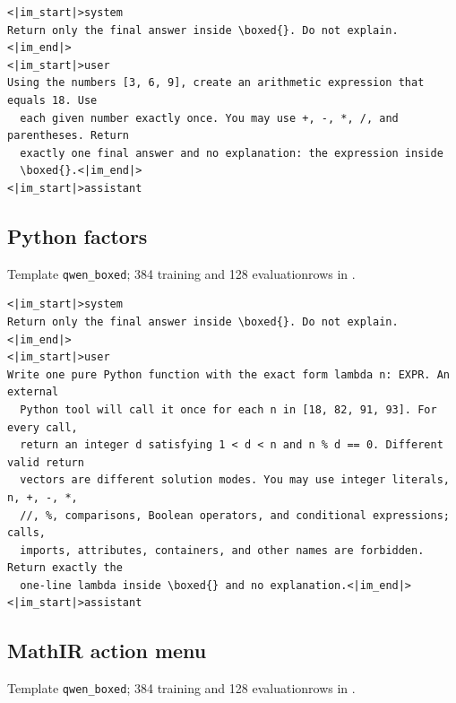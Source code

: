 \documentclass{article}
\newcommand{\1}{\mathbf 1}
\theoremstyle{remark}
\theoremstyle{definition}
\theoremstyle{plain}
\begin{document}
\begin{Verbatim}[fontsize=\scriptsize,frame=single,framesep=4pt,rulecolor=\color{black!25},samepage=true]
<|im_start|>system
Return only the final answer inside \boxed{}. Do not explain.<|im_end|>
<|im_start|>user
Using the numbers [3, 6, 9], create an arithmetic expression that equals 18. Use
  each given number exactly once. You may use +, -, *, /, and parentheses. Return
  exactly one final answer and no explanation: the expression inside
  \boxed{}.<|im_end|>
<|im_start|>assistant
\end{Verbatim}

\filbreak
\subsection{Python factors}
\label{app:prompt-python}

\noindent Template \texttt{qwen\_boxed}; 384 training and 128 evaluation\newline rows in .

\begin{Verbatim}[fontsize=\scriptsize,frame=single,framesep=4pt,rulecolor=\color{black!25},samepage=true]
<|im_start|>system
Return only the final answer inside \boxed{}. Do not explain.<|im_end|>
<|im_start|>user
Write one pure Python function with the exact form lambda n: EXPR. An external
  Python tool will call it once for each n in [18, 82, 91, 93]. For every call,
  return an integer d satisfying 1 < d < n and n % d == 0. Different valid return
  vectors are different solution modes. You may use integer literals, n, +, -, *,
  //, %, comparisons, Boolean operators, and conditional expressions; calls,
  imports, attributes, containers, and other names are forbidden. Return exactly the
  one-line lambda inside \boxed{} and no explanation.<|im_end|>
<|im_start|>assistant
\end{Verbatim}

\filbreak
\subsection{MathIR action menu}
\label{app:prompt-mathir}

\noindent Template \texttt{qwen\_boxed}; 384 training and 128 evaluation\newline rows in .
\end{document}
